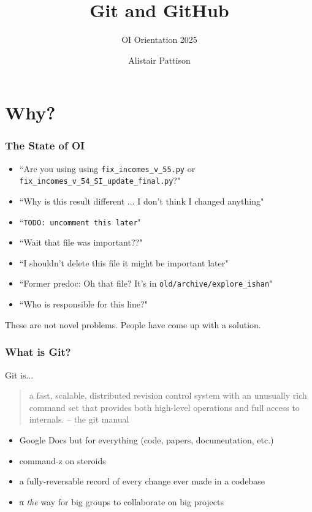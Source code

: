 \documentclass{ali-presentation}
\title{Git and GitHub}
\subtitle{OI Orientation 2025}
\author{Alistair Pattison}
\begin{document}
\begin{frame}
    \titlepage
\end{frame}

\section*{Why?}

\begin{frame}
    \frametitle{The State of OI}

    \begin{itemize}[<+->]
        \item ``Are you using using \texttt{fix\_incomes\_v\_55.py} or \texttt{fix\_incomes\_v\_54\_SI\_update\_final.py}?"
        \item ``Why is this result different ... I don't think I changed anything"
        \item ``\texttt{TODO: uncomment this later}"
        \item ``Wait that file was important??"
        \item ``I shouldn't delete this file it might be important later"
        \item ``Former predoc: Oh that file? It's in \texttt{old/archive/explore\_ishan}"
        \item ``Who is responsible for this line?"
    \end{itemize}

    \centering \bfseries \pause \color{red}

    These are not novel problems. \pause
    People have come up with a solution.

\end{frame}

\begin{frame}
    \frametitle{What is Git?}

    Git is...

    \pause \medskip
    
    \begin{quote}
        a fast, scalable, distributed revision control system with an unusually rich command set that provides both high-level operations and full access to internals.
        \normalfont -- the git manual
    \end{quote}

    \pause

    \begin{itemize}[<+->]
        \item Google Docs but for everything (code, papers, documentation, etc.)
        \item command-z on steroids
        \item a fully-reversable record of every change ever made in a codebase
        \item \sout{a} \emph{the} way for big groups to collaborate on big projects
    \end{itemize}
    
\end{frame}
\end{document}
